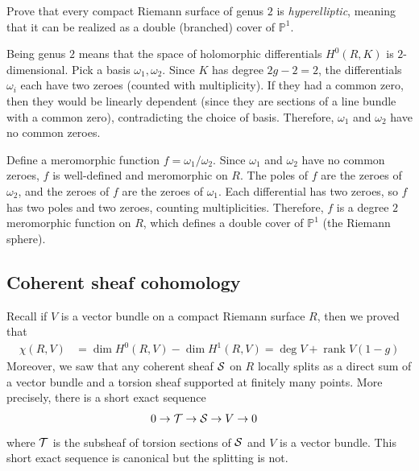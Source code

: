 \documentclass[12pt]{article}
\begin{document}
\begin{exercise}
Prove that every compact Riemann surface of genus $2$ is \textit{hyperelliptic}, meaning that it can be realized as a double (branched) cover of $\mathbb{P}^1$.
\end{exercise}

\begin{solution}
    Being genus $2$ means that the space of holomorphic differentials $H^0(R, K)$ is $2$-dimensional. Pick a basis $\omega_1, \omega_2$. Since $K$ has degree $2g-2=2$, the differentials $\omega_i$ each have two zeroes (counted with multiplicity). If they had a common zero, then they would be linearly dependent (since they are sections of a line bundle with a common zero), contradicting the choice of basis. Therefore, $\omega_1$ and $\omega_2$ have no common zeroes.

    Define a meromorphic function $f = \omega_1/\omega_2$. Since $\omega_1$ and $\omega_2$ have no common zeroes, $f$ is well-defined and meromorphic on $R$. The poles of $f$ are the zeroes of $\omega_2$, and the zeroes of $f$ are the zeroes of $\omega_1$. Each differential has two zeroes, so $f$ has two poles and two zeroes, counting multiplicities. Therefore, $f$ is a degree $2$ meromorphic function on $R$, which defines a double cover of $\mathbb{P}^1$ (the Riemann sphere).
\end{solution}

\subsection{Coherent sheaf cohomology}

Recall if $V$ is a vector bundle on a compact Riemann surface $R$, then we proved that \begin{align*}
    \chi(R,V) & = \dim H^0(R,V) - \dim H^1(R,V) = \deg V + \operatorname{rank} V (1-g)
\end{align*} Moreover, we saw that any coherent sheaf ${\mathcal{S}}$ on $R$ locally splits as a direct sum of a vector bundle and a torsion sheaf supported at finitely many points. More precisely, there is a short exact sequence \begin{align*}
    0 \to {\mathcal{T}} & \to {\mathcal{S}} \to V \to 0
\end{align*} where ${\mathcal{T}}$ is the subsheaf of torsion sections of ${\mathcal{S}}$ and $V$ is a vector bundle. This short exact sequence is canonical but the splitting is not. 
\end{document}
